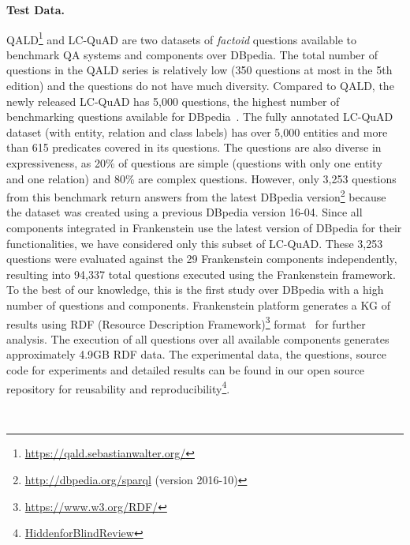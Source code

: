 \documentclass[sigconf,edbt]{acmart-edbt2019}
\begin{document}
{\bf Test Data.} \begin{inparaenum}
QALD\footnote{\url{https://qald.sebastianwalter.org/}} and LC-QuAD \cite{trivedi2017lc} are two datasets of \textit{factoid} questions available to benchmark QA systems and components over DBpedia. The total number of questions in the QALD series is relatively low (350 questions at most in the 5th edition) and the questions do not have much diversity.
Compared to QALD, the newly released LC-QuAD has 5,000 questions, the highest number of benchmarking questions available for DBpedia~\cite{trivedi2017lc}. The fully annotated LC-QuAD dataset (with entity, relation and class labels) has over 5,000 entities and more than 615 predicates covered in its questions. The questions are also diverse in expressiveness, as 20\% of questions are simple (questions with only one entity and one relation) and 80\% are complex questions. However, only 3,253 questions from this benchmark return answers from the latest DBpedia version\footnote{\url{http://dbpedia.org/sparql} (version 2016-10)} because the dataset was created using a previous DBpedia version 16-04. Since all components integrated in Frankenstein use the latest version of DBpedia for their functionalities, we have considered only this subset of LC-QuAD. These 3,253 questions were evaluated against the 29 Frankenstein components independently, resulting into 94,337 total questions executed using the Frankenstein framework. To the best of our knowledge, this is the first study over DBpedia with a high number of questions and components. Frankenstein platform generates a KG of results using
RDF (Resource Description Framework)\footnote{\url{https://www.w3.org/RDF/}}
format~\cite{DBLP:conf/esws/SinghBRS18} for further analysis. 
The execution of all questions over all available components generates approximately 4.9GB RDF data. The experimental data, the questions, source code for experiments and detailed results can be found in our open source repository for reusability and reproducibility\footnote{\url{HiddenforBlindReview}}.
\end{inparaenum}
~\\
\noindent
\end{document}

